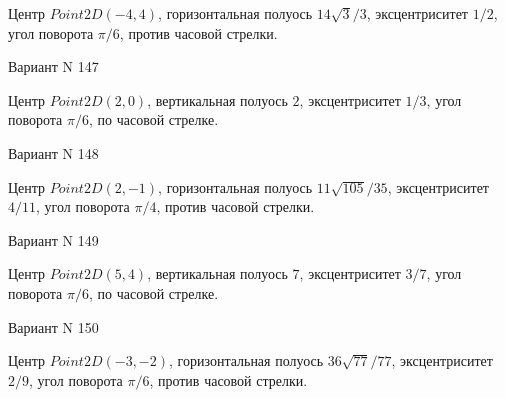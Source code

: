 \documentclass[11pt]{report}
\begin{document}
Центр $Point2D\left(-4, 4\right)$, горизонтальная полуось $14 \sqrt{3} / 3$, эксцентриситет $1 / 2$, угол поворота $\pi / 6$, против часовой стрелки.

Вариант N 147

Центр $Point2D\left(2, 0\right)$, вертикальная полуось $2$, эксцентриситет $1 / 3$, угол поворота $\pi / 6$, по часовой стрелке.

Вариант N 148

Центр $Point2D\left(2, -1\right)$, горизонтальная полуось $11 \sqrt{105} / 35$, эксцентриситет $4 / 11$, угол поворота $\pi / 4$, против часовой стрелки.

Вариант N 149

Центр $Point2D\left(5, 4\right)$, вертикальная полуось $7$, эксцентриситет $3 / 7$, угол поворота $\pi / 6$, по часовой стрелке.

Вариант N 150

Центр $Point2D\left(-3, -2\right)$, горизонтальная полуось $36 \sqrt{77} / 77$, эксцентриситет $2 / 9$, угол поворота $\pi / 6$, против часовой стрелки.
\end{document}
